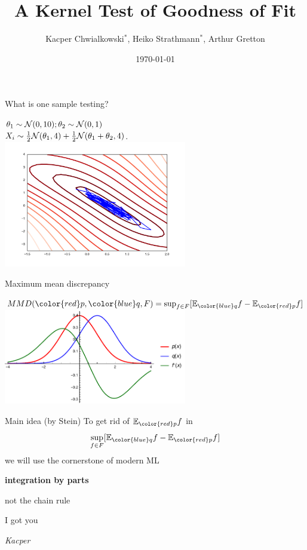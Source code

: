 \documentclass{beamer}
\title{ A Kernel Test of Goodness of Fit}
\date{\today}
\author{Kacper Chwialkowski$^*$, Heiko Strathmann$^*$, Arthur Gretton}
\institute{}
\begin{document}
\frame{\titlepage}
 \begin{frame}{What is one sample testing?}
 \begin{center}
$\theta_{1}\sim{\cal N}(0,10);\theta_{2}\sim{\cal N}(0,1)$\\
$ X_{i}\sim\frac{1}{2}{\cal N}(\theta_{1},4)+\frac{1}{2}{\cal N}(\theta_{1}+\theta_{2},4) $.
 \includegraphics[width=0.6\textwidth]{./img/sgld_trace_and_density.pdf} 
 \end{center}
 \end{frame}
 
 \begin{frame}{Maximum mean discrepancy}
 \begin{center}
$MMD({\color{red} p},{ \color{blue} q},F) = \sup_{ f\in F} [\ev_{{ \color{blue} q}}f - \ev_{{\color{red} p}} f]  $\\
\vspace{0.5cm}
 \includegraphics[width=0.6\textwidth]{./img/mmd.pdf} 
 \end{center}
 \end{frame} 
 
 
 
 \begin{frame}{Main idea (by Stein)}
To get rid of $\ev_{{\color{red} p}}f$  in $$ \sup_{f \in F} [\ev_{{ \color{blue} q}}f - \ev_{{\color{red} p}} f ] $$we will use the cornerstone of modern ML

\pause
\textbf{integration by parts}

\pause 
not the chain rule

\pause
I got you

\pause 
\begin{flushright}
\small \textit{Kacper} 
\end{flushright}



\end{frame} 
\end{document}

